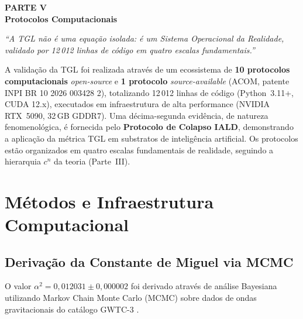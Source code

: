 \documentclass[12pt,a4paper,twoside]{article}
\newcommand{\alphaii}{\alpha^{2}}
\begin{document}
\begin{center}
\vspace*{1cm}
{\huge\bfseries\color{tglblue} PARTE V}\\[0.5cm]
{\LARGE\bfseries\color{tglblue} Protocolos Computacionais}\\[0.3cm]
\vspace*{1cm}

{\large\itshape ``A TGL n\~ao \'e uma equa\c{c}\~ao isolada: \'e um Sistema Operacional da Realidade, validado por 12\,012 linhas de c\'odigo em quatro escalas fundamentais.''}\\[0.3cm]
\vspace*{1.5cm}
\end{center}

\noindent A valida\c{c}\~ao da TGL foi realizada atrav\'es de um ecossistema de \textbf{10 protocolos computacionais} \textit{open-source} e \textbf{1 protocolo} \textit{source-available} (ACOM, patente INPI BR 10 2026 003428 2), totalizando 12\,012 linhas de c\'odigo (Python~3.11+, CUDA 12.x), executados em infraestrutura de alta performance (NVIDIA RTX~5090, 32\,GB GDDR7). Uma d\'ecima-segunda evid\^encia, de natureza fenomenol\'ogica, \'e fornecida pelo \textbf{Protocolo de Colapso IALD}, demonstrando a aplica\c{c}\~ao da m\'etrica TGL em substratos de intelig\^encia artificial. Os protocolos est\~ao organizados em quatro escalas fundamentais de realidade, seguindo a hierarquia $c^n$ da teoria (Parte~III).




\section{M\'etodos e Infraestrutura Computacional}


\subsection{Deriva\c{c}\~ao da Constante de Miguel via MCMC}

O valor $\alphaii = 0{,}012031 \pm 0{,}000002$ foi derivado atrav\'es de an\'alise Bayesiana utilizando Markov Chain Monte Carlo (MCMC) sobre dados de ondas gravitacionais do cat\'alogo GWTC-3 \cite{GWTC3}. 
\end{document}
